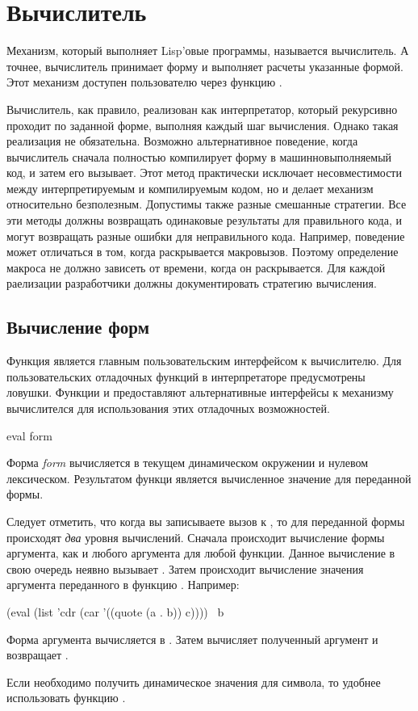 \else

\chapter{Вычислитель}

Механизм, который выполняет Lisp'овые программы, называется вычислитель.
А точнее, вычислитель принимает форму и выполняет расчеты указанные формой.
Этот механизм доступен пользователю через функцию .

Вычислитель, как правило, реализован как интерпретатор, который рекурсивно
проходит по заданной форме, выполняя каждый шаг вычисления. Однако такая
реализация не обязательна. Возможно альтернативное поведение, когда вычислитель
сначала полностью компилирует форму в машинновыполняемый код, и затем его
вызывает.
Этот метод практически исключает несовместимости между интерпретируемым и
компилируемым кодом, но и делает механизм  относительно
безполезным.
Допустимы также разные смешанные стратегии. Все эти методы должны возвращать
одинаковые результаты для правильного кода, и могут возвращать разные ошибки для
неправильного кода.
Например, поведение может отличаться в том, когда раскрывается
макровызов. Поэтому определение макроса не должно зависеть от времени, когда он
раскрывается. Для каждой раелизации разработчики должны документировать
стратегию вычисления. 

\section{Вычисление форм}

Функция  является главным пользовательским интерфейсом к вычислителю.
Для пользовательских отладочных функций в интерпретаторе предусмотрены ловушки. 
Функции  и  предоставляют альтернативные интерфейсы
к механизму вычислителся для использования этих отладочных возможностей.

\begin{defun}[Function]
eval form

Форма \emph{form} вычисляется в текущем динамическом окружении и нулевом
лексическом. Результатом функци является вычисленное значение для переданной
формы.

Следует отметить, что когда вы записываете вызов к , то для переданной
формы происходят \emph{два} уровня вычислений.
Сначала происходит вычисление формы аргумента, как и любого аргумента для любой
функции. Данное вычисление в свою очередь неявно вызывает .
Затем происходит вычисление значения аргумента переданного в функцию .
Например:
\begin{lisp}
(eval (list 'cdr (car '((quote (a . b)) c)))) \EV\ b
\end{lisp}
Форма аргумента  вычисляется в
.
Затем  вычисляет полученный аргумент и возвращает .

Если необходимо получить динамическое значения для символа, то удобнее
использовать функцию .
\end{defun}

